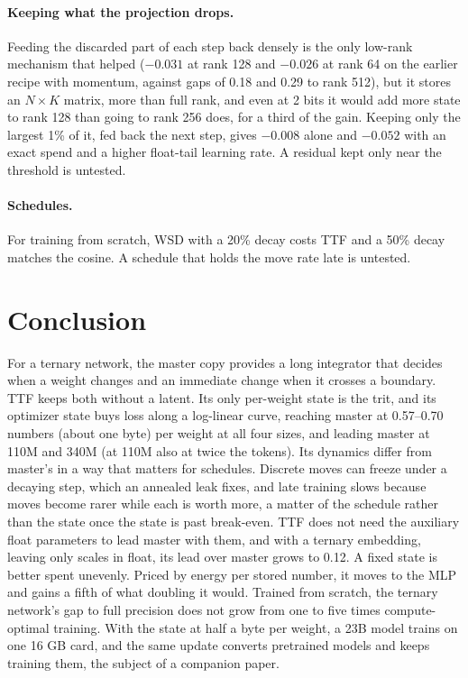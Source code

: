 \documentclass[10pt,twocolumn]{article}
\begin{document}
\paragraph{Keeping what the projection drops.} Feeding the discarded part of each step back densely is the only
low-rank mechanism that helped ($-0.031$ at rank 128 and $-0.026$ at rank 64 on the earlier recipe with momentum,
against gaps of 0.18 and 0.29 to rank 512), but it stores an $N\times K$ matrix, more than full rank, and even at 2 bits it would add more state to
rank 128 than going to rank 256 does, for a third of the gain. Keeping only the largest 1\% of it, fed back the next step,
gives $-0.008$ alone and $-0.052$ with an exact spend and a higher float-tail learning rate. A residual kept only near the
threshold is untested.

\paragraph{Schedules.} For training from scratch, WSD with a 20\% decay costs TTF and a 50\% decay matches the cosine.
A schedule that holds the move rate late is untested.

\section{Conclusion}
For a ternary network, the master copy provides a long integrator that decides when a weight changes and an immediate
change when it crosses a boundary. TTF keeps both without a latent. Its only per-weight state is the trit, and its
optimizer state buys loss along a log-linear curve, reaching master at 0.57--0.70 numbers (about one byte) per weight
at all four sizes, and leading master at 110M and 340M (at 110M also at twice the tokens). Its dynamics differ from
master's in a way that matters for schedules. Discrete moves can freeze under a decaying step, which an annealed leak
fixes, and late training slows because moves become rarer while each is worth more, a matter of the schedule rather
than the state once the state is past break-even. TTF does not need the auxiliary float parameters to lead master with
them, and with a ternary embedding, leaving only scales in float, its lead over master grows to 0.12. A fixed state is
better spent unevenly. Priced by energy per stored number, it moves to the MLP and gains a fifth of what doubling it
would. Trained from scratch, the ternary network's gap to full precision does not grow from one to five times
compute-optimal training. With the state at half a byte per weight, a 23B model trains on one 16 GB card, and the
same update converts pretrained models and keeps training them, the subject of a companion paper.
\end{document}
